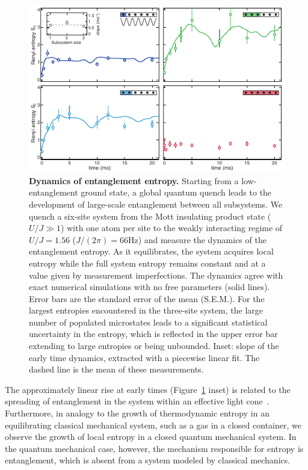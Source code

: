 \begin{figure}[t!]
	\centering
	\includegraphics[scale=1.5]{figures/ETH_EE_dynamics.pdf}
	\caption{{\bf Dynamics of entanglement entropy. } Starting from a low-entanglement ground state, a global quantum quench leads to the development of large-scale entanglement between all subsystems. We quench a six-site system from the Mott insulating product state ($U/J\gg 1$) with one atom per site to the weakly interacting regime of $U/J=1.56$ ($J/(2\pi) = 66\mathrm{Hz}$) and measure the dynamics of the entanglement entropy. As it equilibrates, the system acquires local entropy while the full system entropy remains constant and at a value given by measurement imperfections. The dynamics agree with exact numerical simulations with no free parameters (solid lines). Error bars are the standard error of the mean (S.E.M.). For the largest entropies encountered in the three-site system, the large number of populated microstates leads to a significant statistical uncertainty in the entropy, which is reflected in the upper error bar extending to large entropies or being unbounded. Inset: slope of the early time dynamics, extracted with a piecewise linear fit. The dashed line is the mean of these measurements.}
	\label{fig:EEDyn}
\end{figure} 

The approximately linear rise at early times (Figure~\ref{fig:EEDyn} inset) is related to the spreading of entanglement in the system within an effective light cone~\cite{CardyOneD,lightcone,Richerme2014}. Furthermore, in analogy to the growth of thermodynamic entropy in an equilibrating classical mechanical system, such as a gas in a closed container, we observe the growth of local entropy in a closed quantum mechanical system. In the quantum mechanical case, however, the mechanism responsible for entropy is entanglement, which is absent from a system modeled by classical mechanics.

